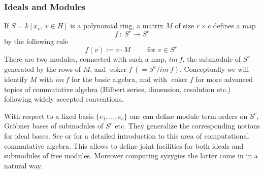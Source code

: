 \subsubsection{Ideals and Modules}

If $S=k[x_v,\ v \in H]$ is a polynomial ring, a matrix $M$ of size
$r\times c$ defines a map
\[f\ :\ S^r \longrightarrow S^c\]
by the following rule
\[ f(v):=v\cdot M \qquad \mbox{ for } v \in S^r.\]
There are two modules, connected with such a map, $im\ f$, the
submodule of $S^c$ generated by the rows of $M$, and $\mathop{\mathrm{coker}} f\
(=S^c/im\ f)$. Conceptually we will identify $M$ with $im\ f$ for the
basic algebra, and with $\mathop{\mathrm{coker}} f$ for more advanced topics of
commutative algebra (Hilbert series, dimension, resolution etc.)
following widely accepted conventions.

With respect to a fixed basis $\{e_1,\ldots ,e_c\}$ one can define
module term orders on $S^c$, Gr\"obner bases of submodules of $S^c$ etc.
They generalize the corresponding notions for ideal bases. See
\cite{Eisenbud:95} or \cite{MoellerMora:86} for a detailed introduction to this area of
computational commutative algebra. This allows to define joint
facilities for both ideals and submodules of free modules. Moreover
computing syzygies the latter come in in a natural way.

